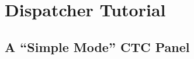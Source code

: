 
\chapter{Dispatcher Tutorial}
\label{chpt:dispatcher:Tutorial}

\section{A ``Simple Mode'' CTC Panel}


